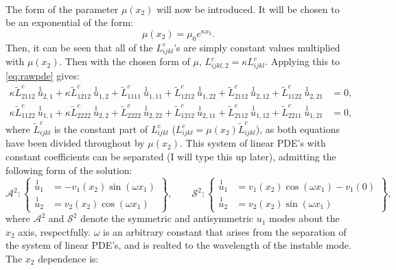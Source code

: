 \documentclass[11pt]{report}
\begin{document}
\begin{appendices}
\begin{equation}
\begin{aligned}
\end{aligned}
\end{equation}
The form of the parameter $\mu(x_2)$ will now be introduced. It will be chosen to be an exponential of the form:
\begin{equation}
\mu(x_2) = \mu_0 e^{\kappa x_2}.
\end{equation}
Then, it can be seen that all of the $L^c_{ijkl}$'s are simply constant values multiplied with $\mu(x_2)$. Then with the chosen form of $\mu$, $L^c_{ijkl,2} = \kappa L^c_{ijkl}$. Applying this to \eqref{eq:rawpde} gives:
\begin{equation} \label{eq:pde}
\begin{aligned}
\kappa \tilde{L}^{c}_{2112} \: \overset{1}{u}_{2,1} + \kappa \tilde{L}^{c}_{1212} \: \overset{1}{u}_{1,2} + \tilde{L}^{c}_{1111} \: \overset{1}{u}_{1,11} + \tilde{L}^{c}_{1212} \: \overset{1}{u}_{1,22}+ \tilde{L}^{c}_{2112} \: \overset{1}{u}_{2,12}  + \tilde{L}^{c}_{1122} \: \overset{1}{u}_{2,21} &= 0,\\
\kappa \tilde{L}^{c}_{1122} \: \overset{1}{u}_{1,1} + \kappa \tilde{L}^{c}_{2222} \: \overset{1}{u}_{2,2} + \tilde{L}^{c}_{2222} \: \overset{1}{u}_{2,22}+ \tilde{L}^{c}_{1212} \: \overset{1}{u}_{2,11}+ \tilde{L}^{c}_{2112} \: \overset{1}{u}_{1,12}  + \tilde{L}^{c}_{2211} \: \overset{1}{u}_{1,21} &= 0,
\end{aligned}
\end{equation}
where $\tilde{L}^{c}_{ijkl}$ is the constant part of $L^{c}_{ijkl}$ (${L}^{c}_{ijkl} = \mu(x_2) \tilde{L}^{c}_{ijkl}$), as both equations have been divided throughout by $\mu(x_2)$.
This system of linear PDE's with constant coefficients can be separated (I will type this up later), admitting the following form of the solution:
\begin{equation} \label{eq:u1_vals}
\mathcal{A}^2 :
\left \{
\begin{aligned}
  \overset{1}{u}_1 &= -v_1(x_2)\sin(\omega x_1) \\
  \overset{1}{u}_2 &=  v_2(x_2)\cos(\omega x_1)
\end{aligned}
\right \} , \qquad
\mathcal{S}^2 :
\left \{
\begin{aligned}
  \overset{1}{u}_1 &= v_1(x_2)\cos(\omega x_1) - v_1(0) \\
  \overset{1}{u}_2 &=  v_2(x_2)\sin(\omega x_1)
\end{aligned}
\right \},
\end{equation}
where $\mathcal{A}^2$ and $\mathcal{S}^2$ denote the symmetric and antisymmetric $u_1$ modes about the $x_2$ axis, respectfully. $\omega$ is an arbitrary constant that arises from the separation of the system of linear PDE's, and is realted to the wavelength of the instable mode. The $x_2$ dependence is:

\end{appendices}
\end{document}
